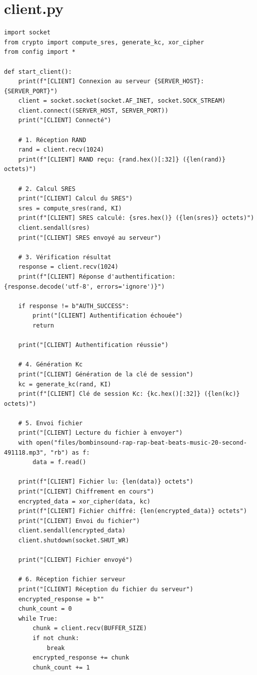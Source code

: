 \documentclass[12pt,a4paper]{report}
\begin{document}
\section{client.py}
\begin{verbatim}
import socket
from crypto import compute_sres, generate_kc, xor_cipher
from config import *

def start_client():
    print(f"[CLIENT] Connexion au serveur {SERVER_HOST}:{SERVER_PORT}")
    client = socket.socket(socket.AF_INET, socket.SOCK_STREAM)
    client.connect((SERVER_HOST, SERVER_PORT))
    print("[CLIENT] Connecté")

    # 1. Réception RAND
    rand = client.recv(1024)
    print(f"[CLIENT] RAND reçu: {rand.hex()[:32]} ({len(rand)} octets)")

    # 2. Calcul SRES
    print("[CLIENT] Calcul du SRES")
    sres = compute_sres(rand, KI)
    print(f"[CLIENT] SRES calculé: {sres.hex()} ({len(sres)} octets)")
    client.sendall(sres)
    print("[CLIENT] SRES envoyé au serveur")

    # 3. Vérification résultat
    response = client.recv(1024)
    print(f"[CLIENT] Réponse d'authentification: {response.decode('utf-8', errors='ignore')}")

    if response != b"AUTH_SUCCESS":
        print("[CLIENT] Authentification échouée")
        return

    print("[CLIENT] Authentification réussie")

    # 4. Génération Kc
    print("[CLIENT] Génération de la clé de session")
    kc = generate_kc(rand, KI)
    print(f"[CLIENT] Clé de session Kc: {kc.hex()[:32]} ({len(kc)} octets)")

    # 5. Envoi fichier
    print("[CLIENT] Lecture du fichier à envoyer")
    with open("files/bombinsound-rap-rap-beat-beats-music-20-second-491118.mp3", "rb") as f:
        data = f.read()

    print(f"[CLIENT] Fichier lu: {len(data)} octets")
    print("[CLIENT] Chiffrement en cours")
    encrypted_data = xor_cipher(data, kc)
    print(f"[CLIENT] Fichier chiffré: {len(encrypted_data)} octets")
    print("[CLIENT] Envoi du fichier")
    client.sendall(encrypted_data)
    client.shutdown(socket.SHUT_WR)

    print("[CLIENT] Fichier envoyé")

    # 6. Réception fichier serveur
    print("[CLIENT] Réception du fichier du serveur")
    encrypted_response = b""
    chunk_count = 0
    while True:
        chunk = client.recv(BUFFER_SIZE)
        if not chunk:
            break
        encrypted_response += chunk
        chunk_count += 1


\end{verbatim}
\end{document}
